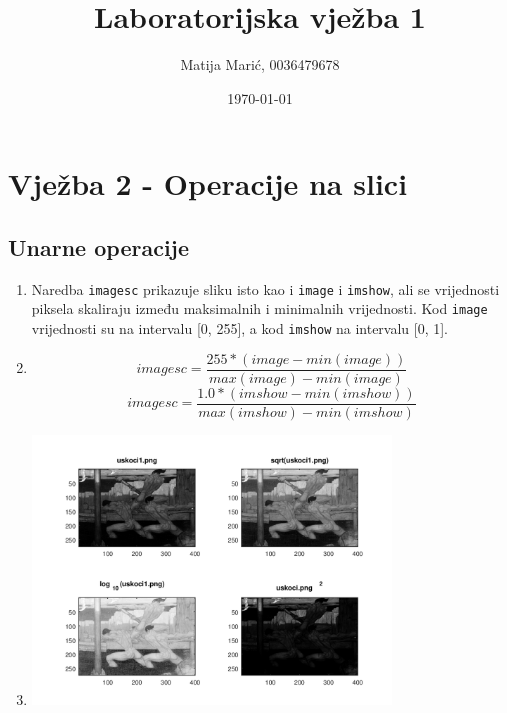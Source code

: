 \documentclass[12pt, a4]{report}
\title{Laboratorijska vježba 1}
\author{Matija Marić, 0036479678}
\date{\today}
\begin{document}
        \begin{titlepage}
            \maketitle
        \end{titlepage}

        \tableofcontents{}

        \chapter{Vježba 2 - Operacije na slici}
        \section{Unarne operacije}
            \begin{enumerate}
                \item Naredba \verb|imagesc| prikazuje sliku isto kao i \verb|image| i \verb|imshow|, ali se vrijednosti piksela skaliraju između maksimalnih i minimalnih vrijednosti.
                    Kod \verb|image| vrijednosti su na intervalu [0, 255], a kod \verb|imshow| na intervalu [0, 1].
                \item
                    \begin{equation}
                        imagesc = \frac{255 * (image - min(image))}{max(image) - min(image)}
                    \end{equation}  
                    \begin{equation}
                        imagesc = \frac{1.0 * (imshow - min(imshow))}{max(imshow) - min(imshow)}
                    \end{equation}
                \item
                    \begin{minipage}{\linewidth}
                        \centering
                        \includegraphics[width=0.75\textwidth]{unary}

\end{minipage}
\end{enumerate}
\end{document}
